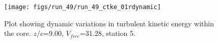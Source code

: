 \begin{figure}[H]
\centering
\texttt{[image: figs/run\_49/run\_49\_ctke\_01rdynamic]}
\caption{Plot showing dynamic variations in turbulent kinetic energy within the core. $z/c$=9.00, $V_{free}$=31.28, station 5.}
\label{fig:run_49_ctke_01rdynamic}
\end{figure}


